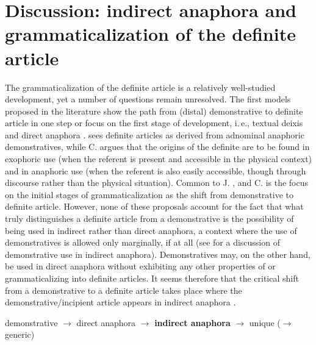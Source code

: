 \documentclass[output=paper]{langsci/langscibook}
\begin{document}
\section{Discussion: indirect anaphora and grammaticalization of the definite article}\label{6sec:5}

The grammaticalization of the definite article is a relatively well-studied development, yet a number of questions remain unresolved. The first models proposed in the literature show the path from (distal) demonstrative to definite article in one step \citep{greenberg:78} or focus on the first stage of development, i.\,e., textual deixis and direct anaphora \citep[J.][]{lyons:75}. \cite{diessel:99} sees definite articles as derived from adnominal anaphoric demonstratives, while C. \cite{lyons:99} argues that the origins of the definite are to be found in exophoric use (when the referent is present and accessible in the physical context) and in anaphoric use (when the referent is also easily accessible, though through discourse rather than the physical situation). Common to J. \cite{lyons:75}, \cite{diessel:99} and C. \cite{lyons:99} is the focus on the initial stages of grammaticalization as the shift from demonstrative to definite article. However, none of these proposals account for the fact that what truly distinguishes a definite article from a demonstrative is the possibility of being used in indirect rather than direct anaphora, a context where the use of demonstratives is allowed only marginally, if at all (see \citealt{charolles:99} for a discussion of demonstrative use in indirect anaphora). Demonstratives may, on the other hand, be used in direct anaphora without exhibiting any other properties of or grammaticalizing into definite articles. It seems therefore that the critical shift from a demonstrative to a definite article takes place where the demonstrative/incipient article appears in indirect anaphora \citep[see also][]{mulder:carlier:11,skrzypek:12}. 

\begin{exe}
\ex\small
{demonstrative $\rightarrow$ direct anaphora $\rightarrow$ {\textbf{indirect anaphora}} $\rightarrow$ unique  ($\rightarrow$ generic)}
\end{exe}
\end{document}
